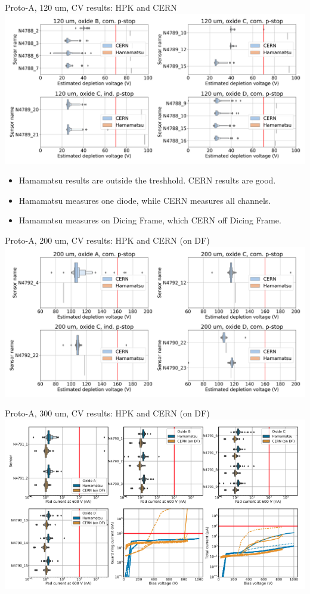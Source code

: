 \documentclass{beamer}
\begin{document}
\begin{frame}{Proto-A, 120 um, CV results: HPK and CERN}
  \includegraphics[width=.8\textwidth]{plots/CV_ComparisonHPKCERN_120um.png}
  \begin{block}{}
    \begin{itemize}
      \item Hamamatsu results are outside the treshhold. CERN results are good.
      \item Hamamatsu measures one diode, while CERN measures all channels.
      \item Hamamatsu measures on Dicing Frame, which CERN off Dicing Frame.
    \end{itemize}
  \end{block}
\end{frame}
\begin{frame}{Proto-A, 200 um, CV results: HPK and CERN (on DF)}
  \includegraphics[width=.9\textwidth]{plots/CV_ComparisonHPK_200um.png}
  \href{https://indico.cern.ch/event/1132823/contributions/4755812/attachments/2399581/4103704/LD\%20proto-A\%20sensors\%20200\%20um\%2C\%20ALPS\%20Winter\%202022.pdf}{}
\end{frame}

\begin{frame}{Proto-A, 300 um, CV results: HPK and CERN (on DF)}
  \includegraphics[width=.8\textwidth]{plots/CV_CERN_HPK_300um.png}
\end{frame}
\end{document}
